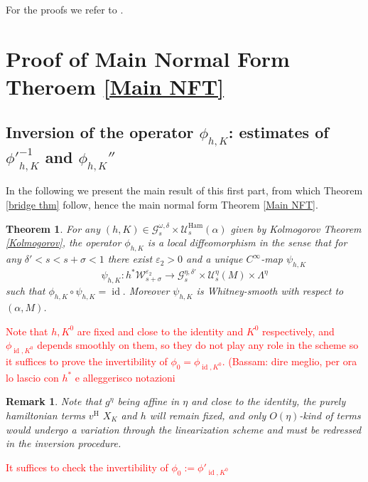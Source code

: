 \documentclass[oneside, 11pt]{amsbook}
\newcommand{\G}{\mathcal{G}}
\newcommand{\U}{\mathcal{U}}
\newcommand{\eps}{\varepsilon}
\newcommand{\vh}{v^{\text{H}}} %
\newcommand{\Uh}{\mathcal{U}^{\operatorname{Ham}}}
\newcommand{\id}{\operatorname{id}}
\def\U{{\mathcal U}}
\newcommand{\cW}{{\mathcal W}}
\newcommand{\0}{{(0)}}
\newcommand{\3}{{(3)}}
\newcommand{\red}[1]{\textcolor{red}{#1}}
\newtheorem{thm}{Theorem}[section]
\newtheorem{rmk}{Remark}[section]
\numberwithin{equation}{section}
\numberwithin{defn}{section}
\numberwithin{prop}{section}
\numberwithin{cor}{section}
\numberwithin{lemma}{section}
\numberwithin{rmk}{section}
\numberwithin{corollary}{section}
\begin{document}
For the proofs we refer to \cite[Section 2.6]{Massetti:ETDS}. 

\section{{Proof of Main Normal Form Theroem \ref{Main NFT}}}







\subsection{Inversion of the operator $\phi_{h,K}$: estimates of ${\phi'}_{h,K}^{-1}$ and $\phi_{h,K}''$}

In the following we present the main result of this first part, from which Theorem \ref{bridge thm} follow, hence the main normal form Theorem \ref{Main NFT}. 

\begin{thm}\label{inverse bridge}
	 For any $(h,K)\in \G^{\omega,\delta}_{s}\times\Uh_s(\alpha)$ given by Kolmogorov Theorem \ref{Kolmogorov}, the operator $\phi_{h,K}$ is a local diffeomorphism in the sense that for any $\delta'< s <s+\sigma<1$ there exist $\eps_2>0$ and a unique $C^\infty$-map $\psi_{h,K}$ $$\psi_{h,K} : h^*\cW^{\eps_2}_{s+\sigma}\to \G^{\eta,\delta'}_{s}\times\U^\eta_s(M)\times\Lambda^\eta$$ such that $\phi_{h,K}\circ\psi_{h,K} = \id.$ Moreover $\psi_{h,K}$ is Whitney-smooth with respect to $(\alpha,M)$. 
\end{thm}

\bigskip 

\red{Note that $h, K^0$ are fixed and close to the identity and $K^0$ respectively, and $\phi_{\id,K^0}$ depends smoothly on them, so they do not play any role in the scheme so it suffices to prove the invertibility of $\phi_0 = \phi_{\id,K^0}$. (Bassam: dire meglio, per ora lo lascio con $h^*$ e alleggerisco notazioni}

\bigskip

  


\medskip




 
\begin{rmk}
Note that $g^\eta$ being affine in $\eta$ and close to the identity, the purely hamiltonian terms $\vh$ $X_K$ and $h$ will remain fixed, and only $O(\eta)$-kind of terms would undergo a variation through the linearization scheme and must be redressed in the inversion procedure. 
\end{rmk}
\red{It suffices to check the invertibility of $\phi_0 := \phi'_{\id,K^0}$}
\end{document}
